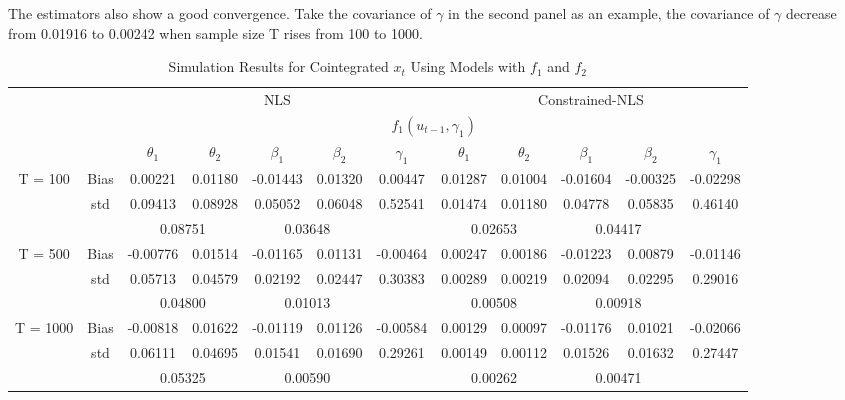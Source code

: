 \documentclass[a4paper,12pt,times,numbered,print,index]{report}
\numberwithin{equation}{section}
\begin{document}
The estimators also show a good convergence. Take the covariance of $\gamma$ in the second panel as an example, the covariance of $\gamma$ decrease from 0.01916 to 0.00242 when sample size T rises from 100 to 1000. 
\begin{table}[htbp]
  \centering
  \caption{Simulation Results for Cointegrated $x_t$ Using Models with $f_1$ and $f_2$}
    \begin{adjustbox}{max width=\textwidth}
    \begin{tabular}{cccccccccccc}
    \toprule
    &       & \multicolumn{5}{c}{NLS}               & \multicolumn{5}{c}{Constrained-NLS} \\
    &       & \multicolumn{10}{c}{$f_1 (u_{t-1}, \gamma_1)$}                \\
    &       & $\theta_1$ & $\theta_2$ & $\beta_1$ & $\beta_2$ & $\gamma_1$ & $\theta_1$ & $\theta_2$ & $\beta_1$ & $\beta_2$ & $\gamma_1$ \\
    \midrule
    \multirow{3}[1]{*}{T = 100} & Bias  & 0.00221 & 0.01180 & -0.01443 & 0.01320 & 0.00447 & 0.01287 & 0.01004 & -0.01604 & -0.00325 & -0.02298 \\
          & std   & 0.09413 & 0.08928 & 0.05052 & 0.06048 & 0.52541 & 0.01474 & 0.01180 & 0.04778 & 0.05835 & 0.46140 \\
          &       & \multicolumn{2}{c}{0.08751} & \multicolumn{2}{c}{0.03648} &       & \multicolumn{2}{c}{0.02653} & \multicolumn{2}{c}{0.04417} &  \\
    \multirow{3}[0]{*}{T = 500} & Bias  & -0.00776 & 0.01514 & -0.01165 & 0.01131 & -0.00464 & 0.00247 & 0.00186 & -0.01223 & 0.00879 & -0.01146 \\
          & std   & 0.05713 & 0.04579 & 0.02192 & 0.02447 & 0.30383 & 0.00289 & 0.00219 & 0.02094 & 0.02295 & 0.29016 \\
          &       & \multicolumn{2}{c}{0.04800} & \multicolumn{2}{c}{0.01013} &       & \multicolumn{2}{c}{0.00508} & \multicolumn{2}{c}{0.00918} &  \\
    \multirow{3}[1]{*}{T = 1000} & Bias  & \textcolor[rgb]{ 0,  .439,  .753}{-0.00818} & 0.01622 & -0.01119 & 0.01126 & -0.00584 & \textcolor[rgb]{ 0,  .439,  .753}{0.00129} & 0.00097 & -0.01176 & 0.01021 & -0.02066 \\
          & std   & 0.06111 & 0.04695 & 0.01541 & 0.01690 & 0.29261 & 0.00149 & 0.00112 & 0.01526 & 0.01632 & 0.27447 \\
          &       & \multicolumn{2}{c}{0.05325} & \multicolumn{2}{c}{0.00590} &       & \multicolumn{2}{c}{0.00262} & \multicolumn{2}{c}{0.00471} &  \\

\end{tabular}
\end{adjustbox}
\end{table}
\end{document}

